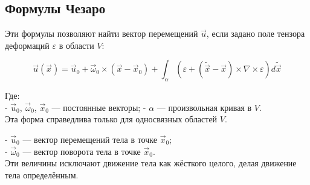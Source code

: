 \subsection*{Формулы Чезаро}
Эти формулы позволяют найти вектор перемещений \( \vec{u} \), если задано поле тензора деформаций \( \varepsilon \) в области \( V \):

\begin{equation}\label{eq:cesaro_formulas}
    \vec{u}(\vec{x}) = \vec{u}_0 + \vec{\omega}_0 \times (\vec{x} - \vec{x}_0) + 
    \int_{\alpha} \left( \varepsilon + (\tilde{\vec{x}} - \vec{x}) \times \nabla \times \varepsilon \right) d\tilde{\vec{x}}
\end{equation}

Где:\\
- \( \vec{u}_0 \), \( \vec{\omega}_0 \), \( \vec{x}_0 \) — постоянные векторы;
- \( \alpha \) — произвольная кривая в \( V \).\\

Эта форма справедлива только для односвязных областей \( V \).

- \( \vec{u}_0 \) — вектор перемещений тела в точке \( \vec{x}_0 \);\\
- \( \vec{\omega}_0 \) — вектор поворота тела в точке \( \vec{x}_0 \).\\

Эти величины исключают движение тела как жёсткого целого, делая движение тела определённым.
